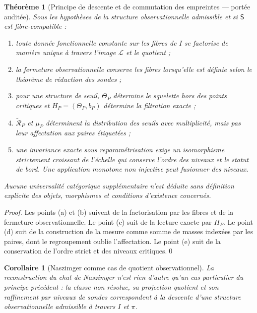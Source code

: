 \documentclass[11pt,a4paper,openany]{book}
\newtheorem{theorem}[definition]{Théorème}
\newtheorem{corollary}[definition]{Corollaire}
\begin{document}
\begin{theorem}[Principe de descente et de commutation des empreintes — portée auditée]
Sous les hypothèses de la structure observationnelle admissible et si \(\mathsf S\) est fibre-compatible :
\begin{enumerate}[label=\textbf{(\alph*)}]
\item toute donnée fonctionnelle constante sur les fibres de \(I\) se factorise de manière unique à travers l'image \(\mathcal L\) et le quotient ;
\item la fermeture observationnelle conserve les fibres lorsqu'elle est définie selon le théorème de réduction des sondes ;
\item pour une structure de seuil, \(\Theta_P\) détermine le squelette hors des points critiques et \(H_P=(\Theta_P,b_P)\) détermine la filtration exacte ;
\item \(\widetilde{\mathcal R}_P\) et \(\mu_P\) déterminent la distribution des seuils avec multiplicité, mais pas leur affectation aux paires étiquetées ;
\item une invariance exacte sous reparamétrisation exige un isomorphisme strictement croissant de l'échelle qui conserve l'ordre des niveaux et le statut de bord. Une application monotone non injective peut fusionner des niveaux.
\end{enumerate}
Aucune universalité catégorique supplémentaire n'est déduite sans définition explicite des objets, morphismes et conditions d'existence concernés.
\end{theorem}
\begin{proof}
Les points (a) et (b) suivent de la factorisation par les fibres et de la fermeture observationnelle. Le point (c) suit de la lecture exacte par \(H_P\). Le point (d) suit de la construction de la mesure comme somme de masses indexées par les paires, dont le regroupement oublie l'affectation. Le point (e) suit de la conservation de l'ordre strict et des niveaux critiques.\qed\end{proof}

\begin{corollary}[Naszimger comme cas de quotient observationnel]
La reconstruction du chat de Naszimger n'est rien d'autre qu'un cas particulier du principe précédent : la classe non résolue, sa projection quotient et son raffinement par niveaux de sondes correspondent à la descente d'une structure observationnelle admissible à travers \(I\) et \(\pi\).
\end{corollary}
\end{document}

